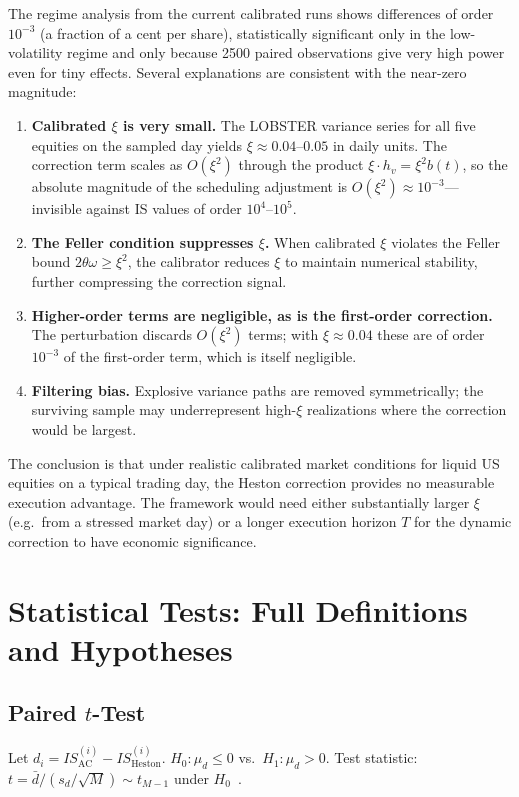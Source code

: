 \documentclass[11pt]{article}
\begin{document}
The regime analysis from the current calibrated runs shows differences of order $10^{-3}$
(a fraction of a cent per share), statistically significant only in the low-volatility regime
and only because 2500 paired observations give very high power even for tiny effects.
Several explanations are consistent with the near-zero magnitude:
\begin{enumerate}[label=(\roman*)]
\item \textbf{Calibrated $\xi$ is very small.}  The LOBSTER variance series for all five
      equities on the sampled day yields $\xi \approx 0.04$--$0.05$ in daily units.  The
      correction term scales as $O(\xi^2)$ through the product $\xi \cdot h_v = \xi^2 b(t)$,
      so the absolute magnitude of the scheduling adjustment is $O(\xi^2) \approx 10^{-3}$---
      invisible against IS values of order $10^4$--$10^5$.
\item \textbf{The Feller condition suppresses $\xi$.}  When calibrated $\xi$ violates the
      Feller bound $2\theta\omega \geq \xi^2$, the calibrator reduces $\xi$ to maintain
      numerical stability, further compressing the correction signal.
\item \textbf{Higher-order terms are negligible, as is the first-order correction.}
      The perturbation discards $O(\xi^2)$ terms; with $\xi \approx 0.04$ these are of
      order $10^{-3}$ of the first-order term, which is itself negligible.
\item \textbf{Filtering bias.}  Explosive variance paths are removed symmetrically;
      the surviving sample may underrepresent high-$\xi$ realizations where the correction
      would be largest.
\end{enumerate}
The conclusion is that under realistic calibrated market conditions for liquid US equities
on a typical trading day, the Heston correction provides no measurable execution advantage.
The framework would need either substantially larger $\xi$ (e.g.\ from a stressed market day)
or a longer execution horizon $T$ for the dynamic correction to have economic significance.

\section{Statistical Tests: Full Definitions and Hypotheses}
\label{app:stats}

\subsection{Paired $t$-Test}
Let $d_i = IS_{\text{AC}}^{(i)} - IS_{\text{Heston}}^{(i)}$.
$H_0\colon \mu_d \leq 0$ vs.\ $H_1\colon \mu_d > 0$.
Test statistic: $t = \bar{d}/(s_d/\sqrt{M}) \sim t_{M-1}$ under $H_0$~\cite{lehmann2005testing}.
\end{document}

